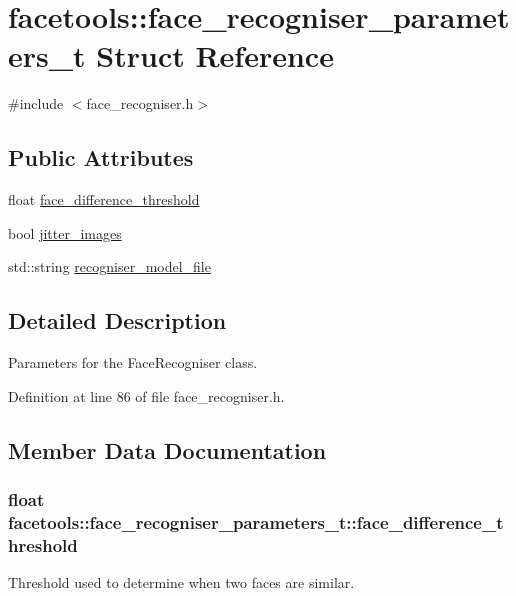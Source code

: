 \hypertarget{structfacetools_1_1face__recogniser__parameters__t}{}\section{facetools\+:\+:face\+\_\+recogniser\+\_\+parameters\+\_\+t Struct Reference}
\label{structfacetools_1_1face__recogniser__parameters__t}


{\ttfamily \#include $<$face\+\_\+recogniser.\+h$>$}

\subsection*{Public Attributes}
\begin{DoxyCompactItemize}
\item 
float \hyperlink{structfacetools_1_1face__recogniser__parameters__t_aba4feecbca96ab1d99f7521acc966b8f}{face\+\_\+difference\+\_\+threshold}
\item 
bool \hyperlink{structfacetools_1_1face__recogniser__parameters__t_a75b4b4192940c2e633af4cb6601815a6}{jitter\+\_\+images}
\item 
std\+::string \hyperlink{structfacetools_1_1face__recogniser__parameters__t_ae5889ff7e799b0f54777be3cb44a9b36}{recogniser\+\_\+model\+\_\+file}
\end{DoxyCompactItemize}


\subsection{Detailed Description}
Parameters for the Face\+Recogniser class. 

Definition at line 86 of file face\+\_\+recogniser.\+h.



\subsection{Member Data Documentation}
\subsubsection[{\texorpdfstring{face\+\_\+difference\+\_\+threshold}{face_difference_threshold}}]{\setlength{\rightskip}{0pt plus 5cm}float facetools\+::face\+\_\+recogniser\+\_\+parameters\+\_\+t\+::face\+\_\+difference\+\_\+threshold}\hypertarget{structfacetools_1_1face__recogniser__parameters__t_aba4feecbca96ab1d99f7521acc966b8f}{}\label{structfacetools_1_1face__recogniser__parameters__t_aba4feecbca96ab1d99f7521acc966b8f}
Threshold used to determine when two faces are similar. 


